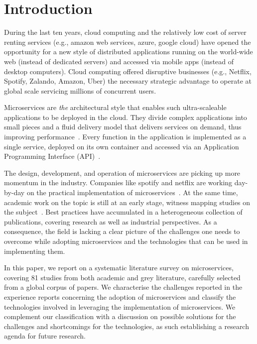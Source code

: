 
\section{Introduction}

During the last ten years, cloud computing and the relatively low cost of server renting services (e.g., amazon web services, azure, google cloud) have opened the opportunity for a new style of distributed applications running on the world-wide web (instead of dedicated servers) and accessed via mobile apps (instead of desktop computers).
Cloud computing offered disruptive businesses (e.g., Netflix, Spotify, Zalando, Amazon, Uber) the necessary strategic advantage to operate at global scale servicing millions of concurrent users.

Microservices are \emph{the} architectural style that enables such ultra-scaleable applications to be deployed in the cloud.
They divide complex applications into small pieces and a fluid delivery model that delivers services on demand, thus improving performance~\cite{Larrucea2018}.
Every function in the application is implemented as a single service, deployed on its own container and accessed via an Application Programming Interface (API)~\cite{Danbettinger2019}.

The design, development, and operation of microservices are picking up more momentum in the industry.
Companies like spotify and netflix are working day-by-day on the practical implementation of microservices~\cite{Kevin2015, Meshenberg2016}.
At the same time, academic work on the topic is still at an early stage, witness mapping studies on the subject~\cite{Soldani2018, Dragoni2017, Olaf2016}.
Best practices have accumulated in a heterogeneous collection of publications, covering research as well as industrial perspectives.
As a consequence, the field is lacking a clear picture of the challenges one needs to overcome while adopting microservices and the technologies that can be used in implementing them.

In this paper, we report on a systematic literature survey on microservices, covering 81 studies from both academic and grey literature, carefully selected from a global corpus of  papers.
We characterise the challenges reported in the experience reports concerning the adoption of microservices and classify the technologies involved in leveraging the implementation of microservices.
We complement our classification with a discussion on possible solutions for the challenges and shortcomings for the technologies, as such establishing a research agenda for future research.


